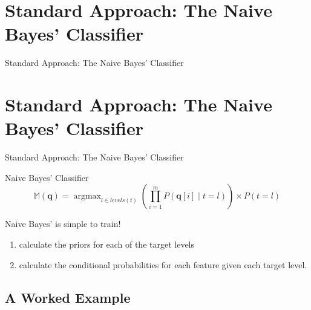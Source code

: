 \documentclass[xcolor={table}]{beamer}
\newcommand{\SectionSlide}[2][]{
	\ifthenelse{\isempty{#1}}
		{\section{#2}\begin{frame} \begin{center}\begin{huge}#2\end{huge}\end{center}\end{frame}}
		{\section[#1]{#2}\begin{frame} \begin{center}\begin{huge}#2\end{huge}\end{center}\end{frame}}
}
\DeclareMathOperator*{\argmax}{argmax}
\begin{document}
\SectionSlide{Standard Approach: The Naive Bayes' Classifier}

 \begin{frame} 
 
 \begin{alertblock}{Naive Bayes' Classifier}
\begin{equation*}
\mathbb{M}(\mathbf{q})= \argmax_{l \in levels(t)} \left( \prod_{i=1}^m P(\mathbf{q}[i]\mid t=l) \right) \times P(t=l)
\end{equation*}
\end{alertblock}
\end{frame} 

\begin{frame}
	\begin{block}{Naive Bayes' is simple to train!}
		\begin{enumerate}
			\item calculate the priors for each of the target levels
			\item calculate the conditional probabilities for each feature given each target level.
		\end{enumerate}
	\end{block}
\end{frame}

\subsection{A Worked Example}
\end{document}

